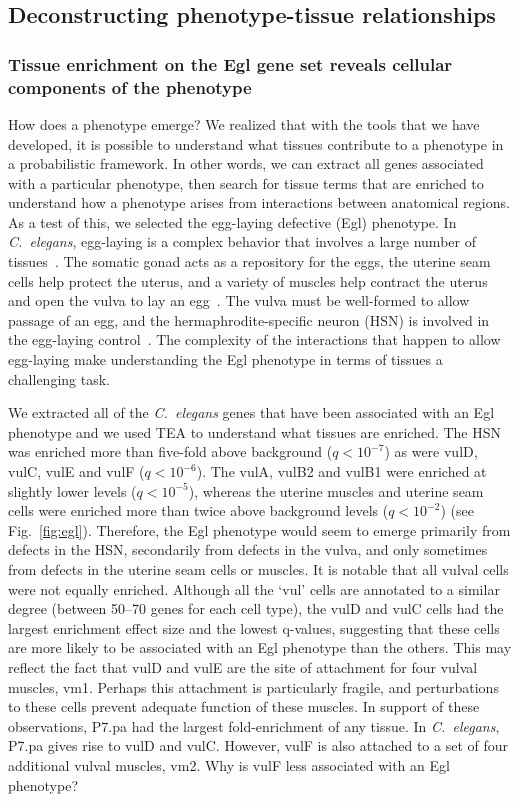 \documentclass[10pt,letterpaper,twocolumn]{article}
\newcommand{\cel}{\emph{C.~elegans}}
\newcommand{\qval}[1]{\ensuremath{q<10^{-#1}}}
\begin{document}
\subsection*{Deconstructing phenotype-tissue relationships}
\subsubsection*{Tissue enrichment on the Egl gene set reveals cellular
components of the phenotype}
How does a phenotype emerge? We realized that with the tools that we have
developed, it is possible to understand what tissues contribute to a phenotype
in a probabilistic framework. In other words, we can extract all genes associated
with a particular phenotype, then search for tissue terms that are enriched to
understand how a phenotype arises from interactions between anatomical regions.
As a test of this, we selected the egg-laying defective (Egl) phenotype.
In \cel{}, egg-laying is a complex behavior that involves
a large number of tissues~\cite{Li1990}. The somatic gonad acts as a
repository for the eggs,
the uterine seam cells help protect the uterus, and a variety of muscles help
contract the uterus and open the vulva to lay an egg~\cite{Sulston1977}. The
vulva must be well-formed
to allow passage of an egg, and the hermaphrodite-specific neuron (HSN) is involved
in the egg-laying control~\cite{Schafer2005}. The complexity of the interactions that
happen to allow egg-laying make understanding the Egl phenotype in terms of
tissues a challenging task.

We extracted all of the \cel{} genes that have been associated with an Egl
phenotype and we used TEA to understand what tissues are enriched. The HSN
was enriched more than five-fold above background (\qval{7}) as were vulD, vulC,
vulE and vulF (\qval{6}). The vulA, vulB2 and vulB1 were
enriched at slightly lower levels (\qval{5}), whereas the uterine muscles and
uterine seam cells were enriched more than twice above background levels
(\qval{2}) (see Fig.~\ref{fig:egl}).
Therefore, the Egl phenotype would seem to emerge primarily from defects in the
HSN, secondarily from defects in the vulva, and only sometimes from defects in the
uterine seam cells or muscles. It is notable that all vulval cells were not equally
enriched. Although all the `vul' cells are annotated to a similar degree (between
50--70 genes for each cell type), the vulD and vulC cells had the largest
enrichment effect size and the lowest q-values, suggesting that these cells
are more likely to be associated with an Egl phenotype than the others. This may
reflect the fact that vulD and vulE are the site of attachment for four vulval
muscles, vm1. Perhaps this attachment is particularly fragile, and perturbations
to these cells prevent adequate function of these muscles. In support of these
observations, P7.pa had the largest fold-enrichment of any tissue. In \cel{},
P7.pa gives rise to vulD and vulC. However, vulF is
also attached to a set of four additional vulval muscles, vm2. Why
is vulF less associated with an Egl phenotype?
\end{document}
